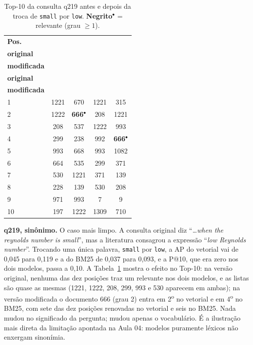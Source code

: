 \documentclass[10pt,twocolumn,a4paper]{article}
\newcommand{\rel}[1]{\textbf{#1}$^{\bullet}$}
\begin{document}
\begin{table}[htbp]
\centering
\scriptsize
\setlength{\tabcolsep}{4pt}
\renewcommand{\cellalign}{bc}
\begin{tabular}{@{}lcccc@{}}
\toprule
\textbf{Pos.} & \makecell{\textbf{Vetorial}\\\textbf{original}} &
\makecell{\textbf{Vetorial}\\\textbf{modificada}} &
\makecell{\textbf{BM25}\\\textbf{original}} &
\makecell{\textbf{BM25}\\\textbf{modificada}}\\
\midrule
1  & 1221 & 670        & 1221 & 315\\
2  & 1222 & \rel{666}  & 208  & 1221\\
3  & 208  & 537        & 1222 & 993\\
4  & 299  & 238        & 992  & \rel{666}\\
5  & 993  & 668        & 993  & 1082\\
6  & 664  & 535        & 299  & 371\\
7  & 530  & 1221       & 371  & 139\\
8  & 228  & 139        & 530  & 208\\
9  & 971  & 993        & 7    & 9\\
10 & 197  & 1222       & 1309 & 710\\
\bottomrule
\end{tabular}
\caption{Top-10 da consulta q219 antes e depois da troca de \texttt{small} por
\texttt{low}. \textbf{Negrito}$^{\bullet}$ = relevante (grau $\geq 1$).}
\label{tab:top10reform}
\end{table}

\textbf{q219, sinônimo.} O caso mais limpo. A consulta original diz
``\textit{\dots when the reynolds number is small}'', mas a literatura consagrou
a expressão ``\textit{low Reynolds number}''. Trocando uma única palavra,
\texttt{small} por \texttt{low}, a AP do vetorial vai de 0,045 para 0,119 e a do
BM25 de 0,037 para 0,093, e a P@10, que era zero nos dois modelos, passa a 0,10.
A Tabela~\ref{tab:top10reform} mostra o efeito no Top-10: na versão original,
nenhuma das dez posições traz um relevante nos dois modelos, e as listas são
quase as mesmas (1221, 1222, 208, 299, 993 e 530 aparecem em ambas); na versão
modificada o documento 666 (grau 2) entra em 2\textsuperscript{o} no vetorial e
em 4\textsuperscript{o} no BM25, com sete das dez posições renovadas no vetorial
e seis no BM25. Nada
mudou no significado da pergunta; mudou apenas o vocabulário. É a ilustração
mais direta da limitação apontada na Aula 04: modelos puramente léxicos não
enxergam sinonímia.
\end{document}
